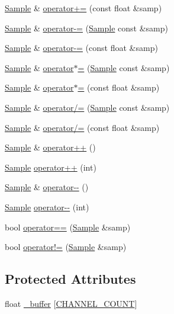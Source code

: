 \begin{DoxyCompactItemize}
\item 
\hyperlink{classDSG_1_1Sample}{Sample} \& \hyperlink{classDSG_1_1Sample_aa1467c3ac617c8920131be21be90c55e}{operator+=} (const float \&samp)
\item 
\hyperlink{classDSG_1_1Sample}{Sample} \& \hyperlink{classDSG_1_1Sample_a3e8c9bfb07c9a1abfbb925e943a77bf2}{operator-\/=} (\hyperlink{classDSG_1_1Sample}{Sample} const \&samp)
\item 
\hyperlink{classDSG_1_1Sample}{Sample} \& \hyperlink{classDSG_1_1Sample_a5c51de986eb773feaa20f3d7408f61fc}{operator-\/=} (const float \&samp)
\item 
\hyperlink{classDSG_1_1Sample}{Sample} \& \hyperlink{classDSG_1_1Sample_acfa0e39c59c941feda43cbf2163d3a3f}{operator$\ast$=} (\hyperlink{classDSG_1_1Sample}{Sample} const \&samp)
\item 
\hyperlink{classDSG_1_1Sample}{Sample} \& \hyperlink{classDSG_1_1Sample_ac7b0d51f729b74652eb942cac16231be}{operator$\ast$=} (const float \&samp)
\item 
\hyperlink{classDSG_1_1Sample}{Sample} \& \hyperlink{classDSG_1_1Sample_a426f95e1ca00e31f597e7974aa348fea}{operator/=} (\hyperlink{classDSG_1_1Sample}{Sample} const \&samp)
\item 
\hyperlink{classDSG_1_1Sample}{Sample} \& \hyperlink{classDSG_1_1Sample_a4949b575aa87fbe23d1f94ebc59a39ad}{operator/=} (const float \&samp)
\item 
\hyperlink{classDSG_1_1Sample}{Sample} \& \hyperlink{classDSG_1_1Sample_ac208ffaa812c14088a87d808048e5901}{operator++} ()
\item 
\hyperlink{classDSG_1_1Sample}{Sample} \hyperlink{classDSG_1_1Sample_a8a46b665400a64135dfa47626775a768}{operator++} (int)
\item 
\hyperlink{classDSG_1_1Sample}{Sample} \& \hyperlink{classDSG_1_1Sample_a592fa599991ca50854a43e6bdbe11ac5}{operator-\/-\/} ()
\item 
\hyperlink{classDSG_1_1Sample}{Sample} \hyperlink{classDSG_1_1Sample_a515bd70b0ad0a894bc279bc772ca4053}{operator-\/-\/} (int)
\item 
bool \hyperlink{classDSG_1_1Sample_a60ee416ba78328059219bf9ef2f716d8}{operator==} (\hyperlink{classDSG_1_1Sample}{Sample} \&samp)
\item 
bool \hyperlink{classDSG_1_1Sample_aaea02c560205ffe02fc0c2dda296f3f8}{operator!=} (\hyperlink{classDSG_1_1Sample}{Sample} \&samp)
\end{DoxyCompactItemize}
\subsection*{Protected Attributes}
\begin{DoxyCompactItemize}
\item 
float \hyperlink{classDSG_1_1Sample_ab3b67b009491583e03d8e97d579e67c2}{\+\_\+buffer} \mbox{[}\hyperlink{Sample_8h_a29e42927003b0aa647ee45965f4ccb07}{C\+H\+A\+N\+N\+E\+L\+\_\+\+C\+O\+U\+N\+T}\mbox{]}
\end{DoxyCompactItemize}
